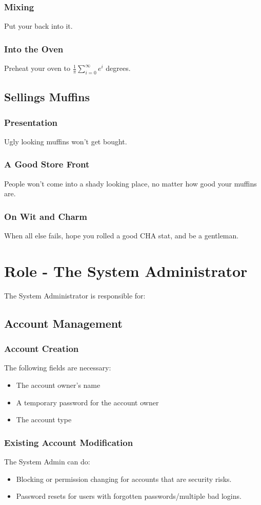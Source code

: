 \documentclass{article}
\begin{document}
\subsubsection{Mixing}
Put your back into it.
\subsubsection{Into the Oven}
Preheat your oven to $\frac{1}{\pi}\sum_{i=0}^{\infty}e^i$ degrees.
\subsection{Sellings Muffins}
\subsubsection{Presentation}
Ugly looking muffins won't get bought.
\subsubsection{A Good Store Front}
People won't come into a shady looking place, no matter how good your muffins are.
\subsubsection{On Wit and Charm}
When all else fails, hope you rolled a good CHA stat, and be a gentleman.

\section{Role - The System Administrator}
The System Administrator is responsible for:
\subsection{Account Management}
\subsubsection{Account Creation}
The following fields are necessary:
\begin{itemize}
  \item The account owner's name
  \item A temporary password for the account owner
  \item The account type
\end{itemize}
\subsubsection{Existing Account Modification}
The System Admin can do:
\begin{itemize}
  \item Blocking or permission changing for accounts that are security risks.
  \item Password resets for users with forgotten passwords/multiple bad logins.
\end{itemize}
\end{document}
